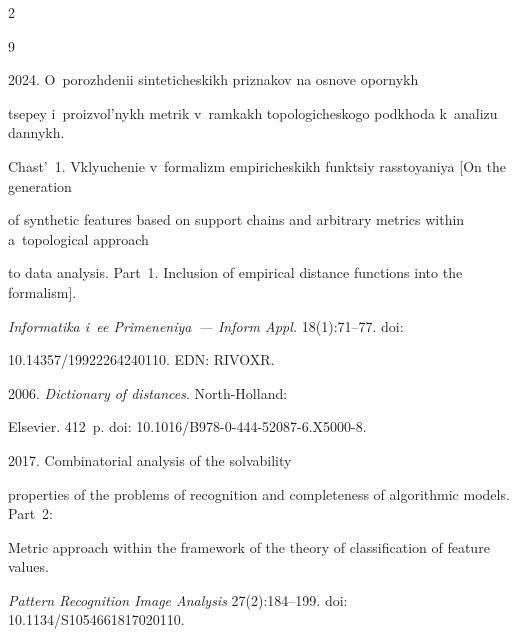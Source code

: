   \begin{multicols}{2}



\renewcommand{\bibname}{\protect\rmfamily References}




{\small\frenchspacing

 {%


 \begin{thebibliography}{9} 

 



 2024. O~porozhdenii sinteticheskikh priznakov na osno\-ve opor\-nykh 

tsepey i~proizvol'nykh metrik v~ram\-kakh topologicheskogo podkhoda k~analizu dannykh. 

Chast'~1. Vklyuchenie v~formalizm empiricheskikh funktsiy rasstoyaniya [On the generation 

of synthetic features based on support chains and arbitrary metrics within a~topological approach 

to data analysis. Part~1. Inclusion of empirical distance functions into the formalism]. 

\textit{Informatika i~ee Primeneniya~--- Inform Appl.} 18(1):71--77. doi: 

10.14357/19922264240110. EDN: RIVOXR.


 2006. \textit{Dictionary of distances}. North-Holland: 

Elsevier. 412~p. doi: 10.1016/B978-0-444-52087-6.X5000-8.


 2017. Combinatorial analysis of the solvability 

properties of the problems of recognition and completeness of algorithmic models. Part~2: 

Metric approach within the framework of the theory of classification of feature values. 

\textit{Pattern Recognition Image Analysis} 27(2):184--199. doi: 10.1134/S1054661817020110.


\end{thebibliography}}}
\end{multicols}
